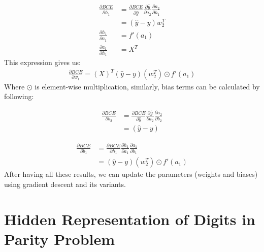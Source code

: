 \documentclass[a4paper, nobind]{templates/ociamthesis}
\begin{document}
\[
\begin{aligned}
\frac{\partial BCE}{\partial h_1} &= \frac{\partial BCE}{\partial \hat{y}} \frac{\partial \hat{y}}{\partial a_{2}} \frac{\partial a_{2}}{\partial h_{1}}  \\
&= \left(\hat{y}-y\right) w_{2}^T \\
\frac{\partial h_1}{\partial a_{1}} &=f'(a_1) \\
\frac{\partial a_{1}}{\partial h_{1}} &=X^T
\end{aligned}
\]
This expression gives us:
\[
\begin{aligned}
\frac{\partial BCE}{\partial w_{1}}= \left(X\right)^T\left(\hat{y}-y\right)\left(w_{2}^T\right) \odot f'(a_1)
\end{aligned}
\]
Where \(\odot\) is element-wise multiplication, similarly, bias terms can be calculated by following:

\[
\begin{aligned} 
\frac{\partial BCE}{\partial b_{2}}&=\frac{\partial BCE}{\partial \hat{y}} \frac{\partial \hat{y}}{\partial a_{2}} \frac{\partial a_{2}}{\partial b_{2}} \\
&= \left(\hat{y}-y\right)
\end{aligned}
\]

\[
\begin{aligned} 
\frac{\partial BCE}{\partial b_{1}}&=\frac{\partial BCE}{\partial h_1} \frac{\partial h_1}{\partial a_{1}} \frac{\partial a_{1}}{\partial b_{1}} \\
&= \left(\hat{y}-y\right)\left(w_{2}^T\right) \odot f'(a_1)
\end{aligned}
\]
After having all these results, we can update the parameters (weights and biases) using gradient descent and its variants.

\hypertarget{hidden-representation-of-digits-in-parity-problem}{%
\chapter{Hidden Representation of Digits in Parity Problem}\label{hidden-representation-of-digits-in-parity-problem}}
\end{document}
